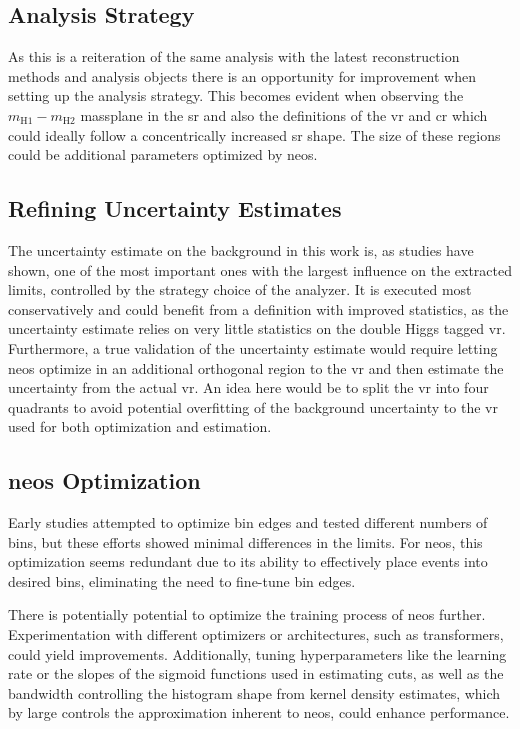 \subsection{Analysis Strategy}
As this is a reiteration of the same analysis with the latest reconstruction methods and analysis objects there is an opportunity for improvement when setting up the analysis strategy. This becomes evident when observing the $m_\text{H1}-m_\text{H2}$ massplane  in the \ac{sr} and also the definitions of the \ac{vr} and \ac{cr} which could ideally follow a concentrically increased \ac{sr} shape. The size of these regions could be additional parameters optimized by \ac{neos}.

\subsection{Refining Uncertainty Estimates}
The uncertainty estimate on the background in this work is, as studies have shown, one of the most important ones with the largest influence on the extracted limits, controlled by the strategy choice of the analyzer. It is executed most conservatively and could benefit from a definition with improved statistics, as the uncertainty estimate relies on very little statistics on the double Higgs tagged \ac{vr}. Furthermore, a true validation of the uncertainty estimate would require letting \ac{neos} optimize in an additional orthogonal region to the \ac{vr} and then estimate the uncertainty from the actual \ac{vr}. An idea here would be to split the \ac{vr} into four quadrants to avoid potential overfitting of the background uncertainty to the \ac{vr} used for both optimization and estimation.


\subsection{\ac{neos} Optimization}
Early studies attempted to optimize bin edges and tested different numbers of bins, but these efforts showed minimal differences in the limits. For \ac{neos}, this optimization seems redundant due to its ability to effectively place events into desired bins, eliminating the need to fine-tune bin edges.

There is potentially potential to optimize the training process of \ac{neos} further. Experimentation with different optimizers or architectures, such as transformers, could yield improvements. Additionally, tuning hyperparameters like the learning rate or the slopes of the sigmoid functions used in estimating cuts, as well as the bandwidth controlling the histogram shape from kernel density estimates, which by large controls the approximation inherent to \ac{neos}, could enhance performance.

